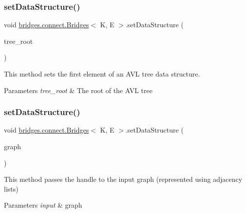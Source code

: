 \subsubsection{\texorpdfstring{set\+Data\+Structure()}{setDataStructure()}\hspace{0.1cm}{\footnotesize\ttfamily [10/12]}}
{\footnotesize\ttfamily void \hyperlink{classbridges_1_1connect_1_1_bridges}{bridges.\+connect.\+Bridges}$<$ K, E $>$.set\+Data\+Structure (\begin{DoxyParamCaption}\item[{\hyperlink{classbridges_1_1base_1_1_a_v_l_tree_element}{A\+V\+L\+Tree\+Element}$<$ K, E $>$}]{tree\+\_\+root }\end{DoxyParamCaption})}

This method sets the first element of an A\+VL tree data structure.


\begin{DoxyParams}{Parameters}
{\em tree\+\_\+root} & The root of the A\+VL tree \\
\hline
\end{DoxyParams}
\hypertarget{classbridges_1_1connect_1_1_bridges_aa5dc1d094955a486e649fdb05d66502f}{}\label{classbridges_1_1connect_1_1_bridges_aa5dc1d094955a486e649fdb05d66502f} 
\subsubsection{\texorpdfstring{set\+Data\+Structure()}{setDataStructure()}\hspace{0.1cm}{\footnotesize\ttfamily [11/12]}}
{\footnotesize\ttfamily void \hyperlink{classbridges_1_1connect_1_1_bridges}{bridges.\+connect.\+Bridges}$<$ K, E $>$.set\+Data\+Structure (\begin{DoxyParamCaption}\item[{\hyperlink{classbridges_1_1base_1_1_graph_adj_list}{Graph\+Adj\+List}$<$ K, E $>$}]{graph }\end{DoxyParamCaption})}

This method passes the handle to the input graph (represented using adjacency lists)


\begin{DoxyParams}{Parameters}
{\em input} & graph \\
\hline
\end{DoxyParams}
\hypertarget{classbridges_1_1connect_1_1_bridges_a1ac1f8a7c5e95500712c2edaa5e8971f}{}\label{classbridges_1_1connect_1_1_bridges_a1ac1f8a7c5e95500712c2edaa5e8971f} 
